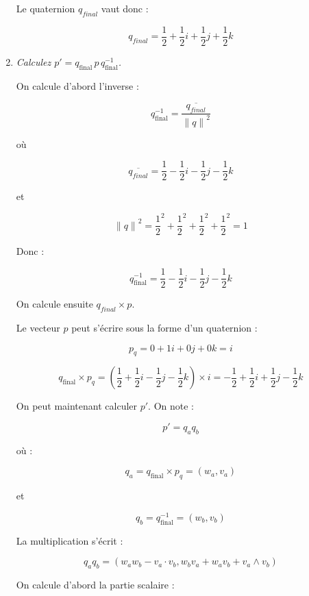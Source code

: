 \documentclass[a4paper,12pt]{article}
\begin{document}
\begin{enumerate}
            Le quaternion \( q_{final} \) vaut donc :

            \[ \boxed{q_{final} = \frac{1}{2} + \frac{1}{2}i + \frac{1}{2}j + \frac{1}{2}k} \]
              
          \item \emph{Calculez \( p' = q_{\text{final}}\,p\,q_{\text{final}}^{-1} \).}

            On calcule d'abord l'inverse :

            \[ q_{\text{final}}^{-1} = \frac{\overline{q_{final}}}{{\lVert q \rVert}^2} \]

            \newpage où

            \[ \overline{q_{final}} = \frac{1}{2} - \frac{1}{2}i - \frac{1}{2}j - \frac{1}{2}k \]

            et 

            \[ {\lVert q \rVert}^2 = \frac{1}{2}^2 + \frac{1}{2}^2 + \frac{1}{2}^2 + \frac{1}{2}^2 = 1 \]

            Donc :

            \[ q_{\text{final}}^{-1} = \frac{1}{2} - \frac{1}{2}i - \frac{1}{2}j - \frac{1}{2}k \]

            On calcule ensuite \(q_{final} \times p\).

            Le vecteur \( p \) peut s'écrire sous la forme d'un quaternion :

            \[ p_q = 0 + 1i + 0j + 0k = i \]

            \[ 
              q_{\text{final}} \times p_q = 
              \left(  \frac{1}{2} + \frac{1}{2}i - \frac{1}{2}j - \frac{1}{2}k \right) \times i
              = -\frac{1}{2} + \frac{1}{2}i + \frac{1}{2}j - \frac{1}{2}k
            \]

            On peut maintenant calculer \( p' \). On note :

            \[ p' = q_a q_b \]

            où :

            \[ q_a = q_{\text{final}} \times p_q = (w_a, v_a) \] 


            et 

            \[ q_b = q_{\text{final}}^{-1} = (w_b, v_b) \]

            La multiplication s'écrit :

            \[ q_a q_b = (w_a w_b - v_a \cdot v_b, w_b v_a + w_a v_b + v_a \wedge v_b) \]

            On calcule d'abord la partie scalaire :


\end{enumerate}
\end{document}
